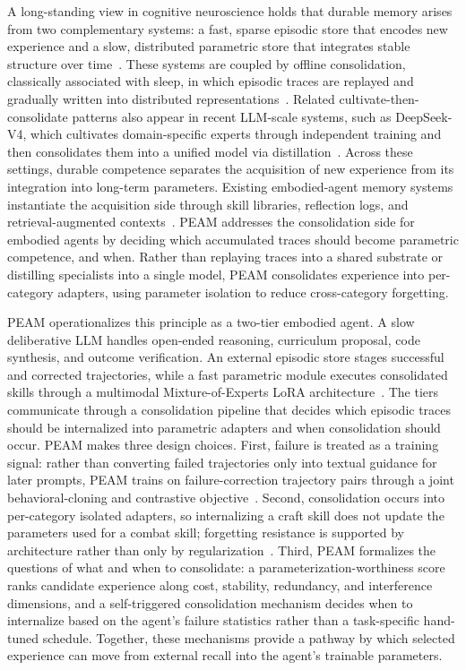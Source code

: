 \documentclass[11pt]{article}
\begin{document}
A long-standing view in cognitive neuroscience holds that durable memory arises from two complementary systems: a fast, sparse episodic store that encodes new experience and a slow, distributed parametric store that integrates stable structure over time~\cite{mcclelland1995there}. These systems are coupled by offline consolidation, classically associated with sleep, in which episodic traces are replayed and gradually written into distributed representations~\cite{mcclelland1995there, klinzing2019mechanisms}. Related cultivate-then-consolidate patterns also appear in recent LLM-scale systems, such as DeepSeek-V4, which cultivates domain-specific experts through independent training and then consolidates them into a unified model via distillation~\cite{deepseek2026v4}. Across these settings, durable competence separates the acquisition of new experience from its integration into long-term parameters. Existing embodied-agent memory systems instantiate the acquisition side through skill libraries, reflection logs, and retrieval-augmented contexts~\cite{shinn2023reflexion, wang2023voyager, wang2024jarvis, li2024optimus, zhu2023ghost}. PEAM addresses the consolidation side for embodied agents by deciding which accumulated traces should become parametric competence, and when. Rather than replaying traces into a shared substrate or distilling specialists into a single model, PEAM consolidates experience into per-category adapters, using parameter isolation to reduce cross-category forgetting.

PEAM operationalizes this principle as a two-tier embodied agent. A slow deliberative LLM handles open-ended reasoning, curriculum proposal, code synthesis, and outcome verification. An external episodic store stages successful and corrected trajectories, while a fast parametric module executes consolidated skills through a multimodal Mixture-of-Experts LoRA architecture~\cite{romer2026clare, ge2025dynamic}. The tiers communicate through a consolidation pipeline that decides which episodic traces should be internalized into parametric adapters and when consolidation should occur. PEAM makes three design choices. First, failure is treated as a training signal: rather than converting failed trajectories only into textual guidance for later prompts, PEAM trains on failure-correction trajectory pairs through a joint behavioral-cloning and contrastive objective~\cite{rafailov2023direct}. Second, consolidation occurs into per-category isolated adapters, so internalizing a craft skill does not update the parameters used for a combat skill; forgetting resistance is supported by architecture rather than only by regularization~\cite{kirkpatrick2017overcoming, rusu2016progressive, mallya2018packnet, mallya2018piggyback}. Third, PEAM formalizes the questions of what and when to consolidate: a parameterization-worthiness score ranks candidate experience along cost, stability, redundancy, and interference dimensions, and a self-triggered consolidation mechanism decides when to internalize based on the agent's failure statistics rather than a task-specific hand-tuned schedule. Together, these mechanisms provide a pathway by which selected experience can move from external recall into the agent's trainable parameters.
\end{document}
